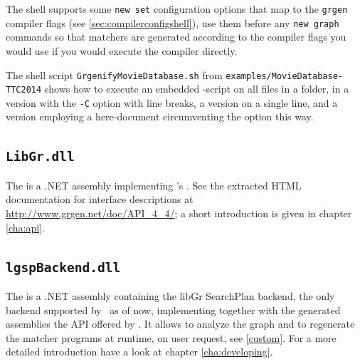 \begin{note}
The shell supports some \texttt{new set} configuration options that map to the \texttt{grgen} compiler flags (see \ref{sec:compilerconfigshell}), use them before any \texttt{new graph} commands so that matchers are generated according to the compiler flags you would use if you would execute the compiler directly.
\end{note}

\begin{example}
The shell script \texttt{GrgenifyMovieDatabase.sh} from \texttt{examples/MovieDatabase-TTC2014} shows how to execute an embedded \GrShell-script on all files in a folder, in a version with the \texttt{-C} option with line breaks, a version on a single line, and a version employing a here-document circumventing the option this way.
\end{example}

\subsection{\texttt{LibGr.dll}}
\label{sct:API}
The \LibGr{} is a .NET assembly implementing \GrG's .
See the extracted HTML documentation for interface descriptions at \url{http://www.grgen.net/doc/API_4_4/};
a short introduction is given in chapter \ref{cha:api}.

\subsection{\texttt{lgspBackend.dll}}
The \LGSPBackend{} is a .NET assembly containing the libGr SearchPlan backend, the only backend supported by \GrG~as of now, implementing together with the generated assemblies the API offered by \LibGr.
It allows to analyze the graph and to regenerate the matcher programs at runtime, on user request, see \ref{custom}.
For a more detailed introduction have a look at chapter \ref{cha:developing}.


